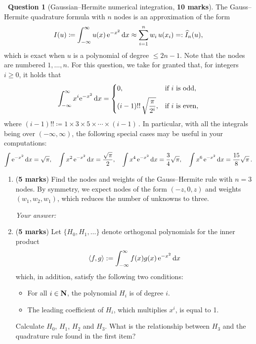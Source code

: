\documentclass[10pt]{article}
\theoremstyle{definition}
\newtheorem{question}{{\normalfont \faGears}~Question}
\renewcommand{\mymarks}[1]{\textbf{#1 marks}}
\begin{document}
\newpage
\begin{question}
    [Gaussian--Hermite numerical integration, \mymarks{10}]

The Gauss--Hermite quadrature formula with \(n\) nodes is an approximation of the form
\[
I(u) \coloneq \int_{-\infty}^{\infty} u(x)\, \mathrm e^{-x^{2}} \, \mathrm d x \approx \sum_{i=1}^n w_i\,u(x_i)=:\widehat I_n(u),
\]
which is exact when \(u\) is a polynomial of degree \(\le 2n-1\).
Note that the nodes are numbered \(1,\dots,n\).
For this question, we take for granted that, for integers \(i\ge 0\),
it holds that
\[
    \int_{-\infty}^{\infty} x^{i} \mathrm e^{-x^{2}}\, \mathrm d x =
    \begin{cases}
        \displaystyle
        0, & \text{if $i$ is odd},\\[2mm]
        \displaystyle
        (i-1)!! \, \sqrt{\frac{\pi}{2^i}}, & \text{if $i$ is even},
    \end{cases}
\]
where 
\(
    (i-1)!! \coloneq 1 \times 3 \times 5 \times \cdots \times (i-1) \, .
\)
In particular, with all the integrals being over $(-\infty, \infty)$,
the following special cases may be useful in your computations:
\[
    \int \mathrm e^{-x^{2}}\, \mathrm d x = \sqrt{\pi}, \quad
    \int x^2 \, \mathrm e^{-x^{2}}\, \mathrm d x = \frac{\sqrt{\pi}}{2}, \quad
    \int x^4 \, \mathrm e^{-x^{2}}\, \mathrm d x = \frac{3}{4} \sqrt{\pi}, \quad
    \int x^6 \, \mathrm e^{-x^{2}}\, \mathrm d x = \frac{15}{8} \sqrt{\pi}\, .
\]



\begin{enumerate}
\item (\mymarks{5})
Find the nodes and weights of the Gauss--Hermite rule with \(n=3\) nodes.
By symmetry,
we expect nodes of the form $(-z,0,z)$ and weights $(w_1,w_2,w_1)$,
which reduces the number of unknowns to three.

\textit{Your answer:}
\vspace{7cm}

\newpage
\item (\mymarks{5})  
    Let $\{H_0, H_1, \dotsc\}$ denote orthogonal polynomials for the inner product 
    \[ 
        \langle f, g\rangle := \int_{-\infty}^{\infty} f(x) g(x) \, \mathrm e^{-x^2} \, \mathrm d x 
    \] 
    which, in addition,
    satisfy the following two conditions: 
    \begin{itemize} 
        \item 
            For all $i \in \mathbf N$, the polynomial $H_i$ is of degree $i$. 
        \item 
            The leading coefficient of $H_i$, which multiplies $x^i$, is equal to 1. 
    \end{itemize} 
    Calculate $H_0$, $H_1$, $H_2$ and $H_3$.
    What is the relationship between \(H_3\) and the quadrature rule found in the first item?


\end{enumerate}
\end{question}
\end{document}
